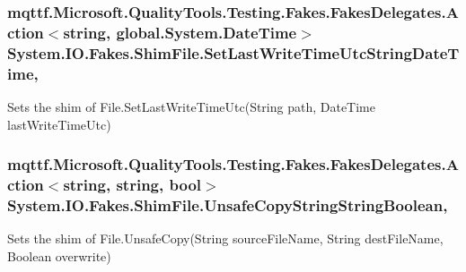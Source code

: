 \hypertarget{class_system_1_1_i_o_1_1_fakes_1_1_shim_file_af7a843fba0ac314f723fcecd36f68da8}{
\subsubsection[{Set\-Last\-Write\-Time\-Utc\-String\-Date\-Time}]{\setlength{\rightskip}{0pt plus 5cm}mqttf.\-Microsoft.\-Quality\-Tools.\-Testing.\-Fakes.\-Fakes\-Delegates.\-Action$<$string, global.\-System.\-Date\-Time$>$ System.\-I\-O.\-Fakes.\-Shim\-File.\-Set\-Last\-Write\-Time\-Utc\-String\-Date\-Time\hspace{0.3cm}{\ttfamily [static]}, {\ttfamily [set]}}}\label{class_system_1_1_i_o_1_1_fakes_1_1_shim_file_af7a843fba0ac314f723fcecd36f68da8}


Sets the shim of File.\-Set\-Last\-Write\-Time\-Utc(\-String path, Date\-Time last\-Write\-Time\-Utc)

\hypertarget{class_system_1_1_i_o_1_1_fakes_1_1_shim_file_a4e3c2ab71fc9cce4782e8921bdf5e5c6}{
\subsubsection[{Unsafe\-Copy\-String\-String\-Boolean}]{\setlength{\rightskip}{0pt plus 5cm}mqttf.\-Microsoft.\-Quality\-Tools.\-Testing.\-Fakes.\-Fakes\-Delegates.\-Action$<$string, string, bool$>$ System.\-I\-O.\-Fakes.\-Shim\-File.\-Unsafe\-Copy\-String\-String\-Boolean\hspace{0.3cm}{\ttfamily [static]}, {\ttfamily [set]}}}\label{class_system_1_1_i_o_1_1_fakes_1_1_shim_file_a4e3c2ab71fc9cce4782e8921bdf5e5c6}


Sets the shim of File.\-Unsafe\-Copy(\-String source\-File\-Name, String dest\-File\-Name, Boolean overwrite)

